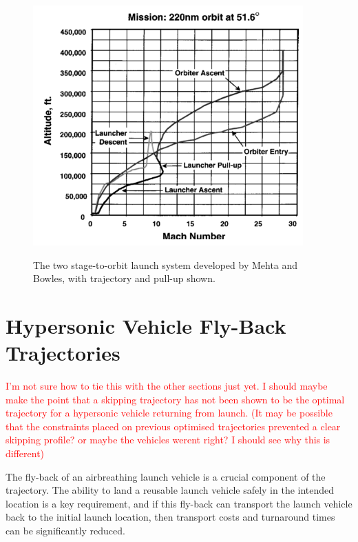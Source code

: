 \begin{figure}[ht]
\begin{minipage}[b]{0.3\textwidth}
		\label{fig:MehtaVehicle}
	\end{minipage}	
	\begin{minipage}[b]{0.6\textwidth}
		\includegraphics[width=\linewidth]{"figures/2_literature-review/Mehta Trajectory"}
		
		\label{fig:MehtaTrajectory}
	\end{minipage}
	\caption{The two stage-to-orbit launch system developed by Mehta and Bowles\cite{Mehta2001}, with trajectory and pull-up shown.}
	\label{fig:Mehta}
\end{figure}


\section{Hypersonic Vehicle Fly-Back Trajectories}
\textcolor{red}{I'm not sure how to tie this with the other sections just yet. I should maybe make the point that a skipping trajectory has not been shown to be the optimal trajectory for a hypersonic vehicle returning from launch. (It may be possible that the constraints placed on previous optimised trajectories prevented a clear skipping profile? or maybe the vehicles werent right? I should see why this is different)}

The fly-back of an airbreathing launch vehicle is a crucial component of the trajectory. The ability to land a reusable launch vehicle safely in the intended location is a key requirement, and if this fly-back can transport the launch vehicle back to the initial launch location, then transport costs and turnaround times can be significantly reduced. 

